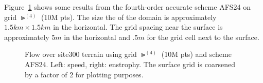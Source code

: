 Figure~\ref{fig:terrainFlow} shows some results from the fourth-order accurate scheme AFS24 on grid $\Gt^{(4)}$ (10M pts).
The size the of the domain is approximately $1.5 km \times 1.5 km$ in the horizontal. 
The grid spacing near the surface is approximately $5m$ in the 
horizontal and $.5m$ for the grid cell next to the surface.

{%
\newcommand{\figWidthb}{7.5cm}
\newcommand{\trimfigb}[2]{\trimPlotb{#1}{#2}{.0}{.0}{.05}{.1}}
% 
\begin{figure}[hbt]
\begin{center}
\end{center}
 \caption{Flow over site300 terrain using grid $\Gt^{(4)}$ (10M pts) and scheme AFS24. Left: speed, right: enstrophy.
     The surface grid is coarsened by a factor of 2 for plotting purposes.}
  \label{fig:terrainFlow}
\end{figure}
%
}%